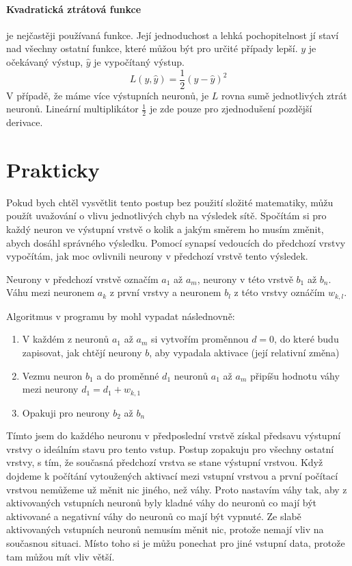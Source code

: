 \documentclass[12pt,a4paper]{report}
\begin{document}
	\paragraph{Kvadratická ztrátová funkce}
	je nejčastěji používaná funkce. Její jednoduchost a lehká pochopitelnost jí staví nad všechny ostatní funkce, které můžou být pro určité případy lepší. $y$ je očekávaný výstup, $\hat{y}$ je vypočítaný výstup.
	$$L(y,\hat{y})=\frac{1}{2}(y-\hat{y})^2$$
	V případě, že máme více výstupních neuronů, je $L$ rovna sumě jednotlivých ztrát neuronů. Lineární multiplikátor $\frac{1}{2}$ je zde pouze pro zjednodušení pozdější derivace.
	
	\section{Prakticky}
	Pokud bych chtěl vysvětlit tento postup bez použití složité matematiky, můžu použít uvažování o vlivu jednotlivých chyb na výsledek sítě. Spočítám si pro každý neuron ve výstupní vrstvě o kolik a jakým směrem ho musím změnit, abych dosáhl správného výsledku. Pomocí synapsí vedoucích do předchozí vrstvy vypočítám, jak moc ovlivnili neurony v předchozí vrstvě tento výsledek.
	
	Neurony v předchozí vrstvě označím $a_1$ až $a_m$, neurony v této vrstvě $b_1$ až $b_n$. Váhu mezi neuronem $a_k$ z první vrstvy a neuronem $b_l$ z této vrstvy oznáčím $w_{k,l}$.
	
	Algoritmus v programu by mohl vypadat následnovně:
	\begin{enumerate}
		\item V každém z neuronů $a_1$ až $a_m$ si vytvořím proměnnou $d=0$, do které budu zapisovat, jak chtějí neurony $b$, aby vypadala aktivace (její relativní změna)
		\item Vezmu neuron $b_1$ a do proměnné $d_1$ neuronů $a_1$ až $a_m$ připíšu hodnotu váhy mezi neurony $d_1=d_1+w_{k,1}$
		\item Opakuji pro neurony $b_2$ až $b_n$
	\end{enumerate}
	Tímto jsem do každého neuronu v předposlední vrstvě získal předsavu výstupní vrstvy o ideálním stavu pro tento vstup. Postup zopakuju pro všechny ostatní vrstvy, s tím, že současná předchozí vrstva se stane výstupní vrstvou. Když dojdeme k počítání vytoužených aktivací mezi vstupní vrstvou a první počítací vrstvou nemůžeme už měnit nic jiného, než váhy. Proto nastavím váhy tak, aby z aktivovaných vstupních neuronů byly kladné váhy do neuronů co mají být aktivované a negativní váhy do neuronů co mají být vypnuté. Ze slabě aktivovaných vstupních neuronů nemusím měnit nic, protože nemají vliv na současnou situaci. Místo toho si je můžu ponechat pro jiné vstupní data, protože tam můžou mít vliv větší.
	
\end{document}
